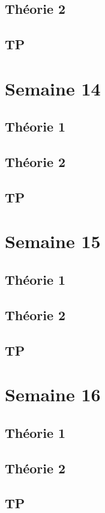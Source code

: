 \documentclass{article}
\begin{document}
\subsection{Théorie 2}
\subsection{TP}

\pagebreak
\section{Semaine 14}
\subsection{Théorie 1}
\subsection{Théorie 2}
\subsection{TP}

\pagebreak
\section{Semaine 15}
\subsection{Théorie 1}
\subsection{Théorie 2}
\subsection{TP}

\pagebreak
\section{Semaine 16}
\subsection{Théorie 1}
\subsection{Théorie 2}
\subsection{TP}

\pagebreak
\end{document}
